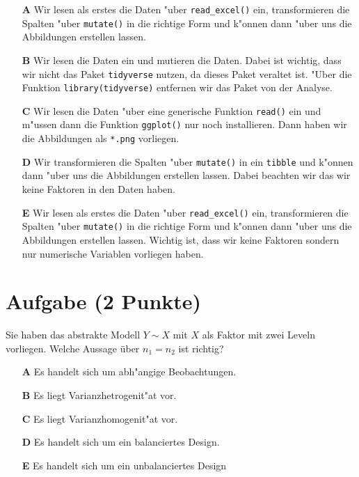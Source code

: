 \documentclass[a4paper, 9pt]{scrartcl}\usepackage[]{graphicx}\usepackage[]{xcolor}
\begin{document}
\begin{enumerate}
\item [\textbf{A} \msquare] Wir lesen als erstes die Daten {"u}ber \texttt{read\_excel()} ein, transformieren die Spalten {"u}ber \texttt{mutate()} in die richtige Form und k{"o}nnen dann {"u}ber  uns die Abbildungen erstellen lassen.
\item [\textbf{B} \msquare] Wir lesen die Daten ein und mutieren die Daten. Dabei ist wichtig, dass wir nicht das Paket \texttt{tidyverse} nutzen, da dieses Paket veraltet ist. {"U}ber die Funktion \texttt{library(tidyverse)} entfernen wir das Paket von der Analyse.
\item [\textbf{C} \msquare] Wir lesen die Daten {"u}ber eine generische Funktion \texttt{read()} ein und m{"u}ssen dann die Funktion \texttt{ggplot()} nur noch installieren. Dann haben wir die Abbildungen als \texttt{*.png} vorliegen.
\item [\textbf{D} \msquare] Wir transformieren die Spalten {"u}ber \texttt{mutate()} in ein \texttt{tibble} und k{"o}nnen dann {"u}ber  uns die Abbildungen erstellen lassen. Dabei beachten wir das wir keine Faktoren in den Daten haben.
\item [\textbf{E} \msquare] Wir lesen als erstes die Daten {"u}ber \texttt{read\_excel()} ein, transformieren die Spalten {"u}ber \texttt{mutate()} in die richtige Form und k{"o}nnen dann  {"u}ber  uns die Abbildungen erstellen lassen. Wichtig ist, dass wir keine Faktoren sondern nur numerische Variablen vorliegen haben.
\end{enumerate}

\section{Aufgabe \hfill (2 Punkte)}




Sie haben das abstrakte Modell $Y \sim X$ mit $X$ als Faktor mit zwei
Leveln vorliegen. Welche Aussage {\"u}ber $n_1 = n_2$ ist richtig?



\begin{enumerate}
\item [\textbf{A} \msquare] Es handelt sich um abh{"a}ngige Beobachtungen.
\item [\textbf{B} \msquare] Es liegt Varianzhetrogenit{"a}t vor.
\item [\textbf{C} \msquare] Es liegt Varianzhomogenit{"a}t vor.
\item [\textbf{D} \msquare] Es handelt sich um ein balanciertes Design.
\item [\textbf{E} \msquare] Es handelt sich um ein unbalanciertes Design
\end{enumerate}
\end{document}
